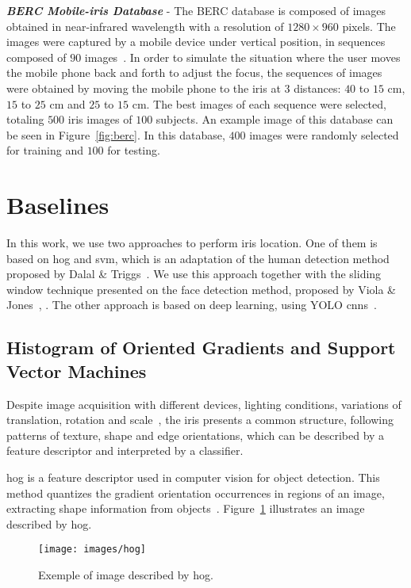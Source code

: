 \documentclass[conference]{IEEEtran}
\begin{document}
\textit{\textbf{BERC Mobile-iris Database}} - The BERC database is composed of images obtained in near-infrared wavelength with a resolution of $1280\times960$ pixels. 
The images were captured by a mobile device under vertical position, in sequences composed of $90$ images~\cite{kim2016empirical}.
In order to simulate the situation where the user moves the mobile phone back and forth to adjust the focus, the sequences of images were obtained by moving the mobile phone to the iris at $3$ distances: $40$ to $15$ cm, $15$ to $25$ cm and $25$ to $15$ cm.
The best images of each sequence were selected, totaling $500$ iris images of $100$ subjects.
An example image of this database can be seen in Figure~\ref{fig:berc}.
In this database, $400$ images were randomly selected for training and $100$ for testing.


\section{Baselines}
\label{sec:baselines}

In this work, we use two approaches to perform iris location. 
One of them is based on \gls*{hog} and \gls*{svm}, which is an adaptation of the human detection method proposed by Dalal \& Triggs~\cite{dalal2005histograms}. 
We use this approach together with the sliding window technique presented on the face detection method, proposed by Viola \& Jones~\cite{viola2001}, \cite{viola2004}.
The other approach is based on deep learning, using YOLO \glspl*{cnn}~\cite{redmon:2016}.

\subsection{Histogram of Oriented Gradients and Support Vector Machines}
Despite image acquisition with different devices, lighting conditions, variations of translation, rotation and scale~\cite{zhu2000biometric}, the iris presents a common structure, following patterns of texture, shape and edge orientations, which can be described by a feature descriptor and interpreted by a classifier.

\gls*{hog} is a feature descriptor used in computer vision for object detection. This method quantizes the gradient orientation occurrences in regions of an image, extracting shape information from objects~\cite{dalal2005histograms}. 
Figure~\ref{fig:hog} illustrates an image described by \gls*{hog}.

\begin{figure}[!htb]
\centering
\texttt{[image: images/hog]}
\vspace{-6mm}
\caption{Exemple of image described by \gls*{hog}.}
\label{fig:hog}
\vspace{-2mm}
\end{figure}
\end{document}

